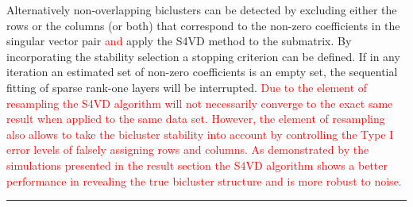 \documentclass{bioinfo}
\begin{document}
\begin{methods}
Alternatively non-overlapping biclusters can be detected by excluding either the rows or the columns (or both) that correspond to the non-zero coefficients in the singular vector pair \textcolor{red}{and} apply the S4VD method to the submatrix. By incorporating the stability selection a stopping criterion can be defined. If in any iteration an estimated set of non-zero coefficients is an empty set, the sequential fitting of sparse rank-one layers will be interrupted. 
\textcolor{red}{Due to the element of resampling the S4VD algorithm will not necessarily converge to the exact same result when applied to the same data set. However, the element of resampling also allows to take the bicluster stability into account by controlling the Type I error levels of falsely assigning rows and columns. As demonstrated by the simulations presented in the result section the S4VD algorithm shows a better performance in revealing the true bicluster structure and is more robust to noise.}
\\
\hspace{-0.1cm} 
\rule{8.5 cm}{1pt}


\end{methods}
\end{document}
